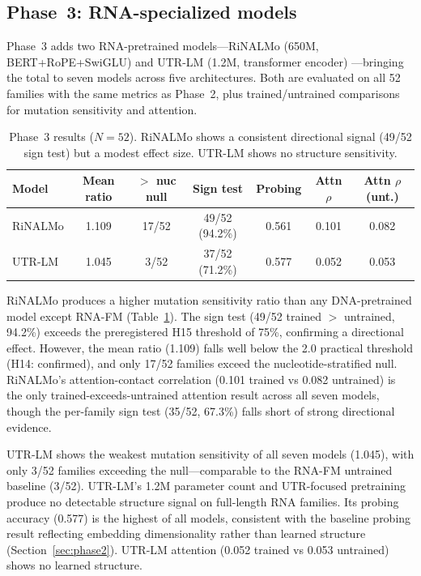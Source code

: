 \documentclass[11pt]{article}
\begin{document}
\subsection{Phase~3: RNA-specialized models}
\label{sec:phase3}

Phase~3 adds two RNA-pretrained models---RiNALMo (650M,
BERT+RoPE+SwiGLU) \citep{penic2024rinalmo} and UTR-LM (1.2M,
transformer encoder) \citep{chu2024utrlm}---bringing the total to
seven models across five architectures.  Both are evaluated on all 52
families with the same metrics as Phase~2, plus trained/untrained
comparisons for mutation sensitivity and attention.

\begin{table}[t]
\centering
\caption{Phase~3 results ($N = 52$).  RiNALMo shows a consistent
  directional signal (49/52 sign test) but a modest effect size.
  UTR-LM shows no structure sensitivity.}
\label{tab:phase3}
\begin{tabular}{@{}lcccccc@{}}
\toprule
\textbf{Model} & \textbf{Mean ratio} & \textbf{$>$ nuc null} &
  \textbf{Sign test} & \textbf{Probing} &
  \textbf{Attn $\rho$} & \textbf{Attn $\rho$ (unt.)} \\
\midrule
RiNALMo & 1.109 & 17/52 & 49/52 (94.2\%) & 0.561 & 0.101 & 0.082 \\
UTR-LM  & 1.045 & 3/52  & 37/52 (71.2\%) & 0.577 & 0.052 & 0.053 \\
\bottomrule
\end{tabular}
\end{table}

RiNALMo produces a higher mutation sensitivity ratio than any
DNA-pretrained model except RNA-FM (Table~\ref{tab:phase3}).  The
sign test (49/52 trained $>$ untrained, 94.2\%) exceeds the
preregistered H15 threshold of 75\%, confirming a directional effect.
However, the mean ratio (1.109) falls well below the 2.0 practical
threshold (H14: confirmed), and only 17/52 families exceed the
nucleotide-stratified null.  RiNALMo's attention-contact correlation
(0.101 trained vs 0.082 untrained) is the only trained-exceeds-untrained
attention result across all seven models, though the per-family sign
test (35/52, 67.3\%) falls short of strong directional evidence.

UTR-LM shows the weakest mutation sensitivity of all seven models
(1.045), with only 3/52 families exceeding the null---comparable to
the RNA-FM untrained baseline (3/52).  UTR-LM's 1.2M parameter count
and UTR-focused pretraining produce no detectable structure signal on
full-length RNA families.  Its probing accuracy (0.577) is the highest
of all models, consistent with the baseline probing result reflecting
embedding dimensionality rather than learned structure
(Section~\ref{sec:phase2}).  UTR-LM attention (0.052 trained vs 0.053
untrained) shows no learned structure.
\end{document}
